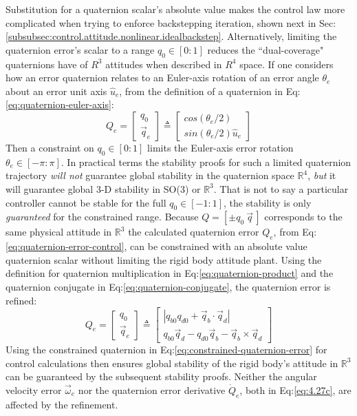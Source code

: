 Substitution for a quaternion scalar's absolute value makes the control law more complicated when trying to enforce backstepping iteration, shown next in Sec:\ref{subsubsec:control.attitude.nonlinear.idealbackstep}. Alternatively, limiting the quaternion error's scalar to a range $q_0\in[0:1]$ reduces the ``dual-coverage" quaternions have of $R^3$ attitudes when described in $R^4$ space. If one considers how an error quaternion relates to an Euler-axis rotation of an error angle $\theta_e$ about an error unit axis $\hat{u}_e$, from the definition of a quaternion in Eq:\ref{eq:quaternion-euler-axis}:
\begin{equation}
Q_e=\begin{bmatrix}
q_0\\
\vec{q}_e
\end{bmatrix}
\triangleq
\begin{bmatrix}
cos(\theta_e/2)\\
sin(\theta_e/2)\hat{u}_e
\end{bmatrix}
\end{equation}
Then a constraint on $q_0\in[0:1]$ limits the Euler-axis error rotation $\theta_e\in[-\pi:\pi]$. In practical terms the stability proofs for such a limited quaternion trajectory \emph{will not} guarantee global stability in the quaternion space $\mathbb{R}^4$, \emph{but} it will guarantee global 3-D stability in SO(3) or $\mathbb{R}^3$. That is not to say a particular controller cannot be stable for the full $q_0\in[-1:1]$, the stability is only \emph{guaranteed} for the constrained range. Because $Q=[\pm q_0~\vec{q}\hspace{2pt}]$ corresponds to the same physical attitude in $\mathbb{R}^{3}$ the calculated quaternion error $Q_e$, from Eq:\ref{eq:quaternion-error-control}, can be constrained with an absolute value quaternion scalar without limiting the rigid body attitude plant. Using the definition for quaternion multiplication in Eq:\ref{eq:quaternion-product} and the quaternion conjugate in Eq:\ref{eq:quaternion-conjugate}, the quaternion error is refined:
\begin{equation}\label{eq:constrained-quaternion-error}
Q_e = \begin{bmatrix}
q_0\\
\vec{q}_e
\end{bmatrix}
\triangleq
\begin{bmatrix}
|q_{b0}q_{d0}+\vec{q}_b\cdot\vec{q}_d|\\
q_{b0}\vec{q}_d-q_{d0}\vec{q}_b-\vec{q}_b\times\vec{q}_d
\end{bmatrix}
\end{equation}
Using the constrained quaternion in Eq:\ref{eq:constrained-quaternion-error} for control calculations then ensures global stability of the rigid body's attitude in $\mathbb{R}^3$ can be guaranteed by the subsequent stability proofs. Neither the angular velocity error $\vec{\omega}_e$ nor the quaternion error derivative $\dot{Q}_e$, both in Eq:\ref{eq:4.27c}, are affected by the refinement.
